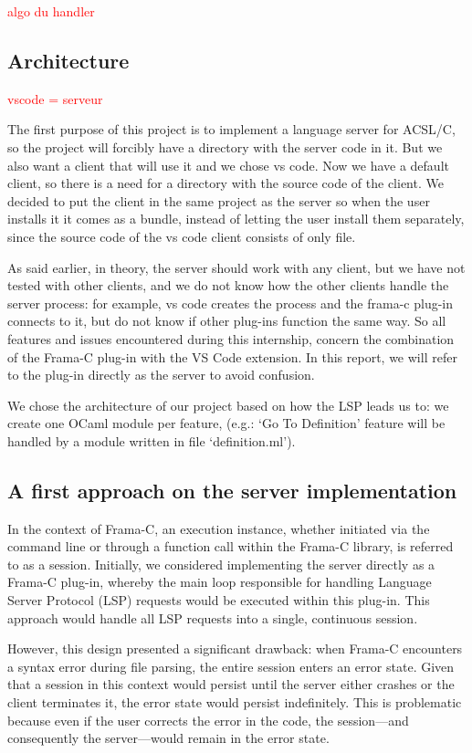 \documentclass[10pt]{article}
\begin{document}
\begin{singlespace}
\textcolor{red}{algo du handler}

\subsection{Architecture}

\textcolor{red}{vscode = serveur}

The first purpose of this project is to implement a language server for ACSL/C, so the project will forcibly have a directory with the server code in it.
But we also want a client that will use it and we chose vs code. Now we have a default client, so there is a need for a directory with the source code of the client.
We decided to put the client in the same project as the server so when the user installs it it comes as a bundle, instead of letting the user install them separately, since the source code of the vs code client consists of only file.

As said earlier, in theory, the server should work with any client, but we have not tested with other clients, and we do not know how the other clients handle the server process: for example, vs code creates the process and the frama-c plug-in connects to it, but do not know if other plug-ins function the same way. So all features and issues encountered during this internship, concern the combination of the Frama-C plug-in with the VS Code extension. In this report, we will refer to the plug-in directly as the server to avoid confusion.

We chose the architecture of our project based on how the LSP leads us to: we create one OCaml module per feature, (e.g.: `Go To Definition' feature will be handled by a module written in file `definition.ml').


\subsection{A first approach on the server implementation}
In the context of Frama-C, an execution instance, whether initiated via the command line or through a function call within the Frama-C library, is referred to as a session. Initially, we considered implementing the server directly as a Frama-C plug-in, whereby the main loop responsible for handling Language Server Protocol (LSP) requests would be executed within this plug-in. This approach would handle all LSP requests into a single, continuous session.

However, this design presented a significant drawback: when Frama-C encounters a syntax error during file parsing, the entire session enters an error state. Given that a session in this context would persist until the server either crashes or the client terminates it, the error state would persist indefinitely. This is problematic because even if the user corrects the error in the code, the session---and consequently the server---would remain in the error state.


\end{singlespace}
\end{document}
